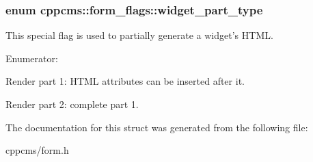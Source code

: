 \subsubsection[{widget\-\_\-part\-\_\-type}]{\setlength{\rightskip}{0pt plus 5cm}enum {\bf cppcms\-::form\-\_\-flags\-::widget\-\_\-part\-\_\-type}}\label{structcppcms_1_1form__flags_ad9bb784f4555eadd91825dc13223c90a}
\-This special flag is used to partially generate a widget's \-H\-T\-M\-L. \begin{Desc}
\item[\-Enumerator\-: ]\par
\begin{description}
\item[{\em 
first\-\_\-part\label{structcppcms_1_1form__flags_ad9bb784f4555eadd91825dc13223c90aab1a8d6383cc6a46590fb188bbce43209}
}]\-Render part 1\-: \-H\-T\-M\-L attributes can be inserted after it. \item[{\em 
second\-\_\-part\label{structcppcms_1_1form__flags_ad9bb784f4555eadd91825dc13223c90aaf182b9b4f04b7c9ddcb37834a2c74559}
}]\-Render part 2\-: complete part 1. \end{description}
\end{Desc}



\-The documentation for this struct was generated from the following file\-:\begin{DoxyCompactItemize}
\item 
cppcms/form.\-h\end{DoxyCompactItemize}
